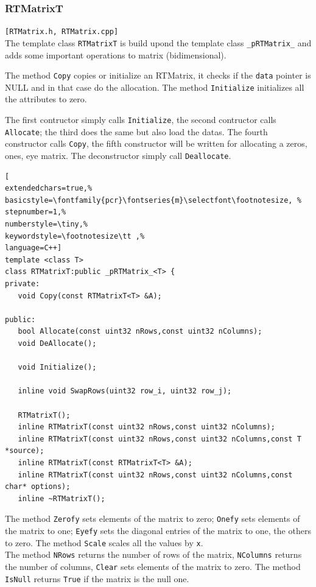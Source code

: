 \subsubsection{RTMatrixT}
\texttt{[RTMatrix.h, RTMatrix.cpp]} \\

The template class \texttt{RTMatrixT} is build upond the template class \texttt{\_pRTMatrix\_} and adds some important operations to matrix (bidimensional).

The method \texttt{Copy} copies or initialize an RTMatrix, it checks if the \texttt{data} pointer is NULL and in that case do the allocation.
The method \texttt{Initialize} initializes all the attributes to zero.

The first contructor simply calls \texttt{Initialize}, the second contructor calls \texttt{Allocate}; the third does the same but also load the datas. The fourth constructor calls \texttt{Copy}, the fifth constructor will be written for allocating a zeros, ones, eye matrix. The deconstructor simply call \texttt{Deallocate}.

\begin{lstlisting}[
extendedchars=true,%
basicstyle=\fontfamily{pcr}\fontseries{m}\selectfont\footnotesize, %
stepnumber=1,%
numberstyle=\tiny,%
keywordstyle=\footnotesize\tt ,%
language=C++]
template <class T>
class RTMatrixT:public _pRTMatrix_<T> {
private:
   void Copy(const RTMatrixT<T> &A);

public:
   bool Allocate(const uint32 nRows,const uint32 nColumns);
   void DeAllocate();

   void Initialize();

   inline void SwapRows(uint32 row_i, uint32 row_j);

   RTMatrixT();
   inline RTMatrixT(const uint32 nRows,const uint32 nColumns);
   inline RTMatrixT(const uint32 nRows,const uint32 nColumns,const T *source);
   inline RTMatrixT(const RTMatrixT<T> &A);
   inline RTMatrixT(const uint32 nRows,const uint32 nColumns,const char* options);
   inline ~RTMatrixT();
\end{lstlisting}

The method \texttt{Zerofy} sets elements of the matrix to zero; \texttt{Onefy} sets elements of the matrix to one; \texttt{Eyefy} sets the diagonal entries of the matrix to one, the others to zero.
The method \texttt{Scale} scales all the values by \texttt{x}.\\


The method \texttt{NRows} returns the number of rows of the matrix, \texttt{NColumns} returns the number of columns, \texttt{Clear} sets elements of the matrix to zero.
The method \texttt{IsNull} returns \texttt{True} if the matrix is the null one.

